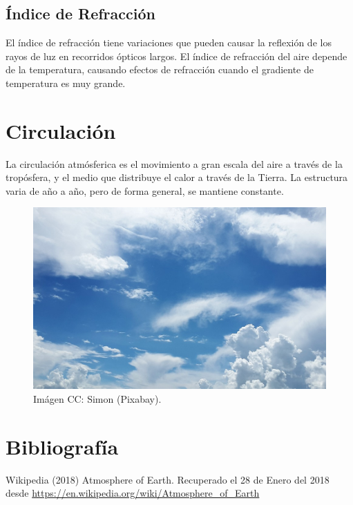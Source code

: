 \documentclass{article}
\begin{document}
\subsection{Índice de Refracción}
El índice de refracción tiene variaciones que pueden causar la reflexión de los rayos de luz en recorridos ópticos largos. El índice de refracción del aire depende de la temperatura, causando efectos de refracción cuando el gradiente de temperatura es muy grande.

\section{Circulación}
La circulación atmósferica es el movimiento a gran escala del aire a través de la tropósfera, y el medio que distribuye el calor a través de la Tierra. La estructura varia de año a año, pero de forma general, se mantiene constante.

\bigskip

\begin{figure}[h]
  \centering
  \includegraphics[width=0.6\linewidth]{atmosfera4.jpg}
  \caption{Imágen CC: Simon (Pixabay).}
\end{figure}

\section{Bibliografía}
Wikipedia (2018) Atmosphere of Earth. Recuperado el 28 de Enero del 2018 desde 
\url{https://en.wikipedia.org/wiki/Atmosphere_of_Earth}
\end{document}
